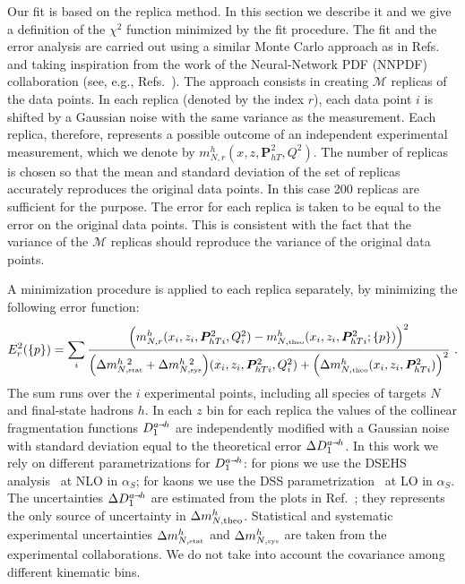 \documentclass[aps,preprintnumbers,showpacs,nofootinbib,superscriptaddress,floatfix]{revtex4}
\newcommand{\smarrow}{\mbox{\raisebox{-4.5pt}[0pt][0pt]{$\hspace{-1pt} 
		\vec{\phantom{v}}$}}}
\newcommand{\Tperp}{T}
\begin{document}
Our fit is based on the replica method. 
In this section we describe it and we give a definition of the $\chi^2$ function minimized by the fit procedure.
The fit and the error analysis are 
carried out using a similar Monte Carlo approach as in Refs.~\cite{Bacchetta:2012ty,Signori:2013mda,Radici:2015mwa} and taking
inspiration from the work of the Neural-Network PDF (NNPDF) collaboration
(see, e.g., Refs.~\cite{Forte:2002fg,Ball:2008by,Ball:2010de}). 
The approach consists in creating $\mathcal{M}$ replicas of the data points. In each replica (denoted by the index $r$), each data point $i$ is shifted by a Gaussian noise with the same variance as the measurement. 
Each replica, therefore, represents a possible outcome of an independent experimental measurement, which we denote by $m_{N, r}^{h}(x, z, \bm{P}_{h\Tperp}^2, Q^2)$. 
The number of replicas is chosen so that the mean and standard deviation of
the set of replicas accurately reproduces the original data points. In this
case 200 replicas are sufficient for the purpose. 
The error for each replica is taken to be equal to the error on the original data points. This is consistent with the fact that the variance of the $\mathcal{M}$ replicas should reproduce the variance of the original data points. 

A minimization procedure is applied to each replica separately, by minimizing the following error function: 
\begin{equation}
E_r^2(\{p\})=\sum_{i} 
\frac{\Bigl(m_{N, r}^{h}(x_i, z_i, \bm{P}_{h\Tperp i}^2, Q_i^2) - m_{N,  \mbox{\tiny theo}}^{h}(x_i, z_i, \bm{P}_{h\Tperp i}^2; \{p\})\Bigr)^2}
        {\Bigl( \Delta m_{N, \mbox{\tiny stat}}^{h\ 2} + \Delta m_{N, \mbox{\tiny sys}}^{h\ 2} \Bigr)(x_i, z_i, \bm{P}_{h\Tperp i}^2, Q^2_i) +\Bigl(\Delta m_{N, \mbox{\tiny theo}}^{h}(x_i, z_i, \bm{P}_{h\Tperp i}^2) \Bigr)^2}\  . 
\label{e:MC_chi2}
\end{equation}
The sum runs over the $i$ experimental points, including all species of targets $N$ and final-state hadrons $h$. 
In each $z$ bin for each replica the values of the collinear fragmentation functions $D_1^{a \smarrow h}$ are independently modified with a Gaussian noise with standard deviation equal to the theoretical error $\Delta D_1^{a\smarrow h}$. 
In this work we rely on different parametrizations for $D_1^{a \smarrow h}$: for pions we use the DSEHS analysis~\cite{deFlorian:2014xna} at NLO in $\alpha_S$; for kaons we use the DSS parametrization~\cite{deFlorian:2007aj} at LO in $\alpha_S$. 
The uncertainties $\Delta D_1^{a\smarrow h}$ are estimated from the plots in Ref.~\cite{Epele:2012vg}; they represents the only source of uncertainty in $\Delta m_{N,  {\rm theo}}^{h}$. 
Statistical and systematic experimental uncertainties $\Delta m_{N, \mbox{\tiny stat}}^{h}$ and $\Delta m_{N, \mbox{\tiny sys}}^{h}$ are taken from the experimental collaborations. 
We do not take into account the covariance among different kinematic bins. 
\end{document}
